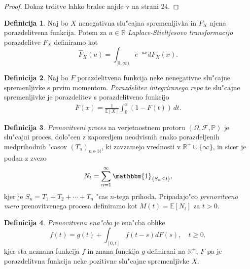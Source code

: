 \documentclass[12pt, a4paper, reqno]{amsart}
\theoremstyle{definition}
\newtheorem{definicija}{Definicija}[section]
\theoremstyle{plain}
\newcommand{\R}{\mathbb{R}}
\newcommand{\N}{\mathbb{N}}
\newcommand{\E}{\mathbb{E}}
\newcommand{\Prob}{\mathbb{P}}
\newcommand{\1}{\mathds{1}}
\begin{document}
    \begin{proof}
        Dokaz trditve lahko bralec najde v \cite{4} na strani 24.
    \end{proof}

    \begin{definicija}
        Naj bo $X$ nenegativna slu"cajna spremenljivka in $F_X$ njena porazdelitvena funkcija. 
        Potem za $u\in\R$ \textit{Laplace-Stieltjesovo transformacijo} porazdelitve $F_X$ definiramo kot
        \begin{equation*}
            \hat{F}_X(u) = \int_{[0, \infty)}e^{-ux}dF_X(x).
        \end{equation*}
        \label{def:LaplaceStiltjesovaTransformacija}
    \end{definicija}

    \begin{definicija}
        Naj bo $F$ porazdelitvena funkcija neke nenegativne slu"cajne spremenljivke s prvim 
        momentom. \textit{Porazdelitev integriranega repa} te slu"cajne spremenljivke je porazdelitev
        s porazdelitveno funkcijo
        \begin{align*}
            \overline{F}(x) = \frac{1}{\mathbb{E}[X]} \int_0^x (1 - F(t)) \, dt.
        \end{align*}

        \label{def:porazdelitevintegriranegaRepa}
    \end{definicija}

    \begin{definicija}
        \textit{Prenovitveni proces} na verjetnostnem protoru $(\Omega, \mathcal{F}, \Prob)$ je slu"cajni 
        proces,
        dolo"cen z zaporedjem neodvisnih enako porazdeljenih medprihodnih "casov $(T_n)_{n\in\N}$, 
        ki zavzamejo vrednosti v $\R^+\cup\{\infty\}$, in sicer je podan z zvezo 
        \begin{equation*}
            N_t = \sum_{n=1}^{\infty}\mathbbm{1}_{\{S_n\leq t\}},
        \end{equation*}
        kjer je $S_n = T_1 + T_2 + \cdots + T_n$ "cas $n$-tega prihoda. Pripadajo"co 
        \textit{prenovitveno mero} prenovitvenega procesa definiramo kot $M(t) = \E\left[N_t\right]$ za 
        $t > 0$.
        \label{def:PrenovitveniProces}
    \end{definicija}

    \begin{definicija}
        \textit{Prenovitvena ena"cba} je ena"cba oblike 
        \begin{equation*}
            f(t) = g(t) + \int_{[0, t]}f(t - s)dF(s), \quad t\geq 0,
        \end{equation*}
        kjer sta neznana funkcija $f$ in znana funckija $g$ definirani na $\R^+$, $F$ pa je 
        porazdelitvna funkcija neke pozitivne slu"cajne spremenljivke $X$.
        \label{def:prenovitvenaEnacba}
    \end{definicija}
\end{document}
